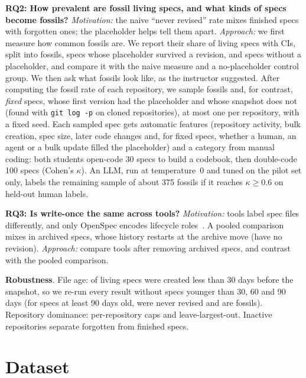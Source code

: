 \documentclass[10pt, conference]{IEEEtran}
\renewcommand{\paragraph}[1]{\noindent\textbf{#1}.}
\begin{document}
\textbf{RQ2: How prevalent are fossil living specs, and what kinds of specs become
fossils?} \emph{Motivation:} the naive ``never revised'' rate mixes finished specs with
forgotten ones; the placeholder helps tell them apart. \emph{Approach:} we first measure
how common fossils are. We report their share of living specs with CIs, split into fossils,
specs whose placeholder survived a revision, and specs without a placeholder, and compare
it with the naive measure and a no-placeholder control group. We then ask what fossils look
like, as the instructor suggested. After computing the fossil rate of each repository, we
sample fossils and, for contrast, \emph{fixed} specs, whose first version had the
placeholder and whose snapshot does not (found with \texttt{git log -p} on cloned
repositories), at most one per repository, with a fixed seed. Each sampled spec gets
automatic features (repository activity, bulk creation, spec size, later code
changes and, for fixed specs, whether a human, an agent or a bulk update filled the
placeholder) and a category from manual coding: both students open-code 30 specs to build a
codebook, then double-code 100 specs (Cohen's $\kappa$). An LLM, run at temperature~0 and
tuned on the pilot set only, labels the remaining sample of about 375 fossils if it reaches
$\kappa \geq 0.6$ on held-out human labels.

\textbf{RQ3: Is write-once the same across tools?} \emph{Motivation:} tools label spec
files differently, and only OpenSpec encodes lifecycle roles~\cite{specmine_paper}. A pooled
comparison mixes in archived specs, whose history restarts at the archive move
(\pctArchivedNeverRevised have no revision). \emph{Approach:} compare tools after
removing archived specs, and contrast with the pooled comparison.

\paragraph{Robustness} File age: \pctLivingYoungThirty of living specs were created less
than 30 days before the snapshot, so we re-run every result without specs younger than
30, 60 and 90 days (for specs at least 90 days old, \pctNeverRevisedOldNinety were never
revised and \pctFossilOldNinety are fossils). Repository dominance: per-repository caps and
leave-largest-out. Inactive repositories separate forgotten from finished specs.

\section{Dataset}
\label{sec:dataset}
\sloppy
\end{document}
